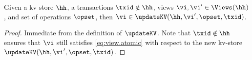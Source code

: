 \begin{lemma}
\label{lem:updatekv.preserveviews}
Given a kv-store $\hh$, a transactions $\txid \notin \hh$, views $\vi, \vi' \in \Views(\hh)$, 
and set of operations $\opset$, then $\vi \in \updateKV(\hh, \vi', \opset, \txid)$.
\end{lemma}

\begin{proof}
Immediate from the definition of $\updateKV$. Note that $\txid \notin \hh$ ensures that 
$\vi$ still satisfies \eqref{eq:view.atomic} with respect to the new kv-store $\updateKV(\hh, \vi', \opset, \txid)$.
\end{proof}
